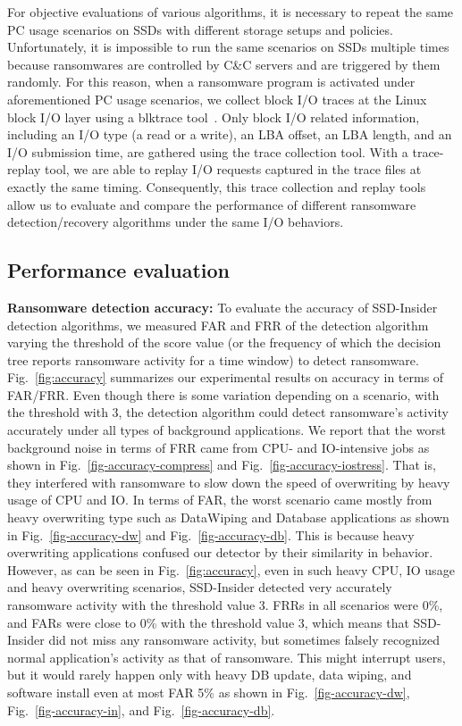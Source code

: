 \documentclass[conference]{IEEEtran}
\newcommand{\ours}{SSD-Insider}
\begin{document}
For objective evaluations of various algorithms, it is necessary to
repeat the same PC usage scenarios on SSDs with different storage
setups and policies.  Unfortunately, it is impossible to run the
same scenarios on SSDs multiple times because ransomwares are
controlled by C\&C servers and are triggered by them randomly. For
this reason, when a ransomware program is activated under
aforementioned PC usage scenarios, we collect block I/O traces at
the Linux block I/O layer using a blktrace tool~\cite{blktrace}.
Only block I/O related information, including an I/O type (a read
or a write), an LBA offset, an LBA length, and an I/O submission
time, are gathered using the trace collection tool.  With a
trace-replay tool, we are able to replay I/O requests captured in
the trace files at exactly the same timing.  Consequently, this
trace collection and replay tools allow us to evaluate and compare
the performance of different ransomware detection/recovery
algorithms under the same I/O behaviors. 


\subsection{Performance evaluation}\label{sec:peval}
{\bf Ransomware detection accuracy:}
To evaluate the accuracy of SSD-Insider detection algorithms, we
measured FAR and FRR of the detection algorithm varying the
threshold of the score value (or the frequency of which the
decision tree reports ransomware activity for a time window) to
detect ransomware.  Fig.~\ref{fig:accuracy} summarizes our
experimental results on accuracy in terms of FAR/FRR.  Even though
there is some variation depending on a scenario, with the threshold
with 3, the detection algorithm could detect ransomware's
activity accurately under all types of background applications.  We
report that the worst background noise in terms of FRR 
came from CPU- and IO-intensive jobs as shown 
in Fig.~\ref{fig-accuracy-compress} and Fig.~\ref{fig-accuracy-iostress}.  
That is, they interfered with ransomware to
slow down the speed of overwriting by heavy usage of CPU and IO.
In terms of FAR, the worst scenario
came mostly from heavy overwriting type such as DataWiping and Database applications
as shown in Fig.~\ref{fig-accuracy-dw} and Fig.~\ref{fig-accuracy-db}. 
This is because heavy overwriting applications confused our detector by
their similarity in behavior.
However, as can be seen in Fig.~\ref{fig:accuracy}, even in such
heavy CPU, IO usage and heavy overwriting scenarios, \ours{} detected very accurately
ransomware activity with the threshold value 3.  
FRRs in all scenarios were 0\%, and FARs were close to 0\% with the threshold value 3, 
which means that \ours{} did not miss any ransomware activity, 
but sometimes falsely recognized normal application's activity as that of ransomware.
This might interrupt users, but it would rarely happen only with heavy
DB update, data wiping, and software install even at most FAR 5\%
as shown in Fig.~\ref{fig-accuracy-dw}, Fig.~\ref{fig-accuracy-in},
and Fig.~\ref{fig-accuracy-db}.
\end{document}
